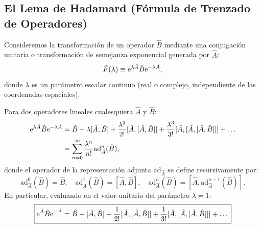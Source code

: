 \subsection{El Lema de Hadamard (Fórmula de Trenzado de Operadores)}

Consideremos la transformación de un operador $\hat{B}$ mediante una conjugación unitaria o transformación de semejanza exponencial generada por $\hat{A}$:
\begin{equation}
    \hat{F}(\lambda) \equiv \mathrm{e}^{\lambda\hat{A}}\hat{B}\mathrm{e}^{-\lambda\hat{A}},
    \label{eq:hadamard_ansatz}
\end{equation}
donde $\lambda$ es un parámetro escalar continuo (real o complejo, independiente de las coordenadas espaciales).

\begin{teoremabox}
    Para dos operadores lineales cualesquiera $\hat{A}$ y $\hat{B}$:
    \begin{align}
        \mathrm{e}^{\lambda\hat{A}}\hat{B}\mathrm{e}^{-\lambda\hat{A}} &= \hat{B} + \lambda[\hat{A}, \hat{B}] + \frac{\lambda^2}{2!}[\hat{A}, [\hat{A}, \hat{B}]] + \frac{\lambda^3}{3!}[\hat{A}, [\hat{A}, [\hat{A}, \hat{B}]]] + \dots \nonumber\\
        &= \sum_{n=0}^\infty \frac{\lambda^n}{n!} \mathrm{ad}_{\hat{A}}^n(\hat{B}),
        \label{eq:hadamard_lemma}
    \end{align}
    donde el operador de la representación adjunta $\mathrm{ad}_{\hat{A}}$ se define recursivamente por:
    \begin{equation}
        \mathrm{ad}_{\hat{A}}^0(\hat{B}) = \hat{B}, \quad \mathrm{ad}_{\hat{A}}^1(\hat{B}) = [\hat{A}, \hat{B}], \quad \mathrm{ad}_{\hat{A}}^n(\hat{B}) = [\hat{A}, \mathrm{ad}_{\hat{A}}^{n-1}(\hat{B})].
    \end{equation}
    En particular, evaluando en el valor unitario del parámetro $\lambda=1$:
    \begin{equation}
        \boxed{\mathrm{e}^{\hat{A}}\hat{B}\mathrm{e}^{-\hat{A}} = \hat{B} + [\hat{A}, \hat{B}] + \frac{1}{2!}[\hat{A}, [\hat{A}, \hat{B}]] + \frac{1}{3!}[\hat{A}, [\hat{A}, [\hat{A}, \hat{B}]]] + \dots}
    \end{equation}
\end{teoremabox}

